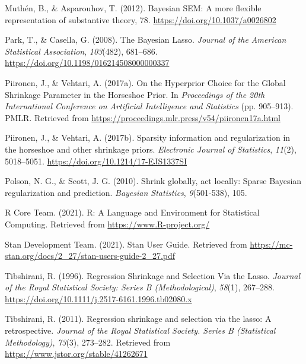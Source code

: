 \documentclass[
  man, donotrepeattitle,floatsintext]{apa6}
\newlength{\cslhangindent}
\newlength{\cslentryspacingunit} %
\newenvironment{CSLReferences}[2] %
 {%
  \setlength{\parindent}{0pt}
  \ifodd #1
  \let\oldpar\par
  \def\par{\hangindent=\cslhangindent\oldpar}
  \fi
  \setlength{\parskip}{#2\cslentryspacingunit}
 }%
 {}
\begin{document}
\begin{CSLReferences}{1}{0}
\leavevmode{}%
Muthén, B., \& Asparouhov, T. (2012). Bayesian {SEM}: {A} more ﬂexible representation of substantive theory, 78. \url{https://doi.org/10.1037/a0026802}

\leavevmode{}%
Park, T., \& Casella, G. (2008). The {Bayesian} {Lasso}. \emph{Journal of the American Statistical Association}, \emph{103}(482), 681--686. \url{https://doi.org/10.1198/016214508000000337}

\leavevmode{}%
Piironen, J., \& Vehtari, A. (2017a). On the {Hyperprior} {Choice} for the {Global} {Shrinkage} {Parameter} in the {Horseshoe} {Prior}. In \emph{Proceedings of the 20th {International} {Conference} on {Artificial} {Intelligence} and {Statistics}} (pp. 905--913). PMLR. Retrieved from \url{https://proceedings.mlr.press/v54/piironen17a.html}

\leavevmode{}%
Piironen, J., \& Vehtari, A. (2017b). Sparsity information and regularization in the horseshoe and other shrinkage priors. \emph{Electronic Journal of Statistics}, \emph{11}(2), 5018--5051. \url{https://doi.org/10.1214/17-EJS1337SI}

\leavevmode{}%
Polson, N. G., \& Scott, J. G. (2010). Shrink globally, act locally: {Sparse} {Bayesian} regularization and prediction. \emph{Bayesian Statistics}, \emph{9}(501-538), 105.

\leavevmode{}%
R Core Team. (2021). R: {A} {Language} and {Environment} for {Statistical} {Computing}. Retrieved from \url{https://www.R-project.org/}

\leavevmode{}%
Stan Development Team. (2021). Stan {User} {Guide}. Retrieved from \url{https://mc-stan.org/docs/2_27/stan-users-guide-2_27.pdf}

\leavevmode{}%
Tibshirani, R. (1996). Regression {Shrinkage} and {Selection} {Via} the {Lasso}. \emph{Journal of the Royal Statistical Society: Series B (Methodological)}, \emph{58}(1), 267--288. \url{https://doi.org/10.1111/j.2517-6161.1996.tb02080.x}

\leavevmode{}%
Tibshirani, R. (2011). Regression shrinkage and selection via the lasso: A retrospective. \emph{Journal of the Royal Statistical Society. Series B (Statistical Methodology)}, \emph{73}(3), 273--282. Retrieved from \url{https://www.jstor.org/stable/41262671}


\end{CSLReferences}
\end{document}
